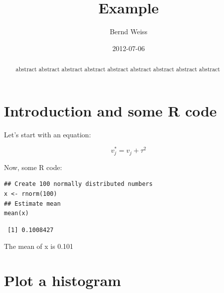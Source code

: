 \documentclass[11pt]{article}
\title{Example}
\author{Bernd Weiss}
\date{2012-07-06}
\begin{document}
\maketitle

\setcounter{tocdepth}{3}
\tableofcontents
\vspace*{1cm}





\begin{abstract}
abstract abstract abstract abstract abstract abstract abstract abstract abstract 
\end{abstract}


\section{Introduction and some R code}
\label{sec-1}


Let's start with an equation: 

\begin{equation}
v^{*}_{j} = v_{j} + \tau^{2} 
\end{equation}

Now, some R code:


\lstset{language=R}
\begin{lstlisting}
## Create 100 normally distributed numbers 
x <- rnorm(100)
## Estimate mean
mean(x)
\end{lstlisting}

\begin{verbatim}
 [1] 0.1008427
\end{verbatim}

The mean of x is 0.101
\section{Plot a histogram}
\label{sec-2}
\end{document}
